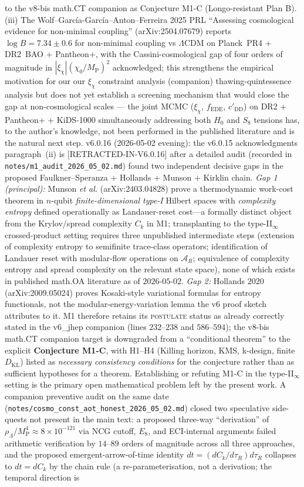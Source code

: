 \documentclass[reprint,amsmath,amssymb,aps,prd,superscriptaddress]{revtex4-2}
\providecommand{\1}{\mathbf{1}}
\begin{document}
to the v8-bis math.CT companion as Conjecture M1-C (Longo-resistant Plan B). (iii) The Wolf--Garc\'ia-Garc\'ia--Anton--Ferreira 2025 PRL ``Assessing cosmological evidence for non-minimal coupling'' (arXiv:2504.07679) reports $\log B = 7.34 \pm 0.6$ for non-minimal coupling vs $\Lambda$CDM on Planck~PR4 + DR2~BAO + Pantheon+, with the Cassini-cosmological gap of four orders of magnitude in $|\xi_\chi|(\chi_0/M_\mathrm{P})^2$ acknowledged; this strengthens the empirical motivation for our our $\xi_\chi$ constraint analysis (companion) thawing-quintessence analysis but does not yet establish a screening mechanism that would close the gap at non-cosmological scales --- the joint MCMC ($\xi_\chi$, $f_\mathrm{EDE}$, $c'_\mathrm{DD}$) on DR2 + Pantheon+ + KiDS-1000 simultaneously addressing both $H_0$ and $S_8$ tensions has, to the author's knowledge, not been performed in the published literature and is the natural next step. v6.0.16 (2026-05-02 evening): the v6.0.15 acknowledgments paragraph~(ii) is [RETRACTED-IN-V6.0.16] after a detailed audit (recorded in \texttt{notes/m1\_audit\_2026\_05\_02.md}) found two independent decisive gaps in the proposed Faulkner--Speranza + Hollands + Munson + Kirklin chain. \emph{Gap 1 (principal):} Munson \emph{et al.} (arXiv:2403.04828) prove a thermodynamic work-cost theorem in $n$-qubit \emph{finite-dimensional type-I} Hilbert spaces with \emph{complexity entropy} defined operationally as Landauer-reset cost---a formally distinct object from the Krylov/spread complexity $C_k$ in M1; transplanting to the type-II$_\infty$ crossed-product setting requires three unpublished intermediate steps (extension of complexity entropy to semifinite trace-class operators; identification of Landauer reset with modular-flow operations on $\mathcal{A}_R$; equivalence of complexity entropy and spread complexity on the relevant state space), none of which exists in published math.OA literature as of $2026$-$05$-$02$. \emph{Gap 2:} Hollands $2020$ (arXiv:2009.05024) proves Kosaki-style variational formulas for entropy functionals, not the modular-energy-variation lemma the v6 proof sketch attributes to it. M1 therefore retains its \textsc{postulate} status as already correctly stated in the v6\_jhep companion (lines $232$--$238$ and $586$--$594$); the v8-bis math.CT companion target is downgraded from a ``conditional theorem'' to the explicit \textbf{Conjecture M1-C}, with H1--H4 (Killing horizon, KMS, k-design, finite $D_\mathrm{KL}$) listed as \emph{necessary consistency conditions} for the conjecture rather than as sufficient hypotheses for a theorem. Establishing or refuting M1-C in the type-II$_\infty$ setting is the primary open mathematical problem left by the present work. A companion preventive audit on the same date (\texttt{notes/cosmo\_const\_aot\_honest\_2026\_05\_02.md}) closed two speculative side-quests not present in the main text: a proposed three-way ``derivation'' of $\rho_\Lambda/M_\mathrm{P}^4 \approx 8\times 10^{-121}$ via NCG cutoff, $E_8$, and ECI-internal arguments failed arithmetic verification by $14$--$89$ orders of magnitude across all three approaches, and the proposed emergent-arrow-of-time identity $dt=(dC_k/d\tau_R)d\tau_R$ collapses to $dt=dC_k$ by the chain rule (a re-parameterisation, not a derivation; the temporal direction is 
\end{document}
